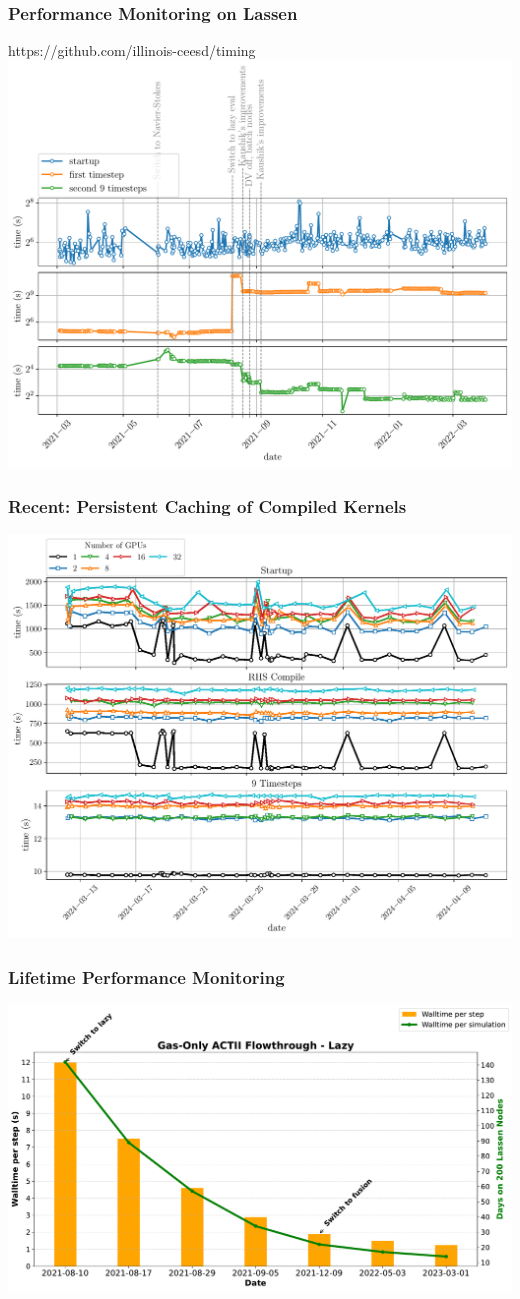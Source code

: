 \begin{frame}\frametitle{Performance Monitoring on Lassen}
\begin{center}
https://github.com/illinois-ceesd/timing\\
\includegraphics[width=.6\textwidth]{Figures/mtc/big_nozzle_timing_history.pdf}
\end{center}
\end{frame}


\begin{frame}\frametitle{Recent: Persistent Caching of Compiled Kernels}
\begin{center}
  \includegraphics[width=.7\textwidth]{Figures/mtc/y3-recent-cached_1.pdf}
\end{center}
\end{frame}



\begin{frame}\frametitle{Lifetime Performance Monitoring}
\centering
\includegraphics[width=.8\textwidth]{Figures/mtc/gas-only-perf.pdf}
\end{frame}

